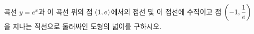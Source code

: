곡선 $y=e^x$과 이 곡선 위의 점 $(1{,}\mkern3mu\mathopen{}e)$에서의 접선 및 이 접선에 수직이고 점 $\left(-1{,}\mkern3mu\mathopen{}\dfrac{1}{e}\right)$을 지나는 직선으로 둘러싸인 도형의 넓이를 구하시오.
